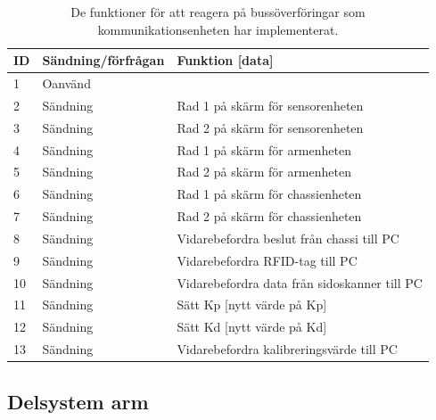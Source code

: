 \begin{table}[H]
\centering

\begin{tabularx}{\textwidth}{|l|l|X|}
\hline
\textbf{ID} & \textbf{Sändning/förfrågan} & \textbf{Funktion [data]} \\ \hline
1 & Oanvänd & \\ \hline
2 & Sändning & Rad 1 på skärm för sensorenheten \\ \hline
3 & Sändning & Rad 2 på skärm för sensorenheten \\ \hline
4 & Sändning & Rad 1 på skärm för armenheten \\ \hline
5 & Sändning & Rad 2 på skärm för armenheten \\ \hline
6 & Sändning & Rad 1 på skärm för chassienheten \\ \hline
7 & Sändning & Rad 2 på skärm för chassienheten \\ \hline
8 & Sändning & Vidarebefordra beslut från chassi till PC \\ \hline
9 & Sändning & Vidarebefordra RFID-tag till PC\\ \hline
10 & Sändning & Vidarebefordra data från sidoskanner till PC \\ \hline
11 & Sändning & Sätt Kp [nytt värde på Kp] \\ \hline
12 & Sändning & Sätt Kd [nytt värde på Kd] \\ \hline
13 & Sändning & Vidarebefordra kalibreringsvärde till PC \\ \hline
\end{tabularx}
\caption{De funktioner för att reagera på bussöverföringar som kommunikationsenheten har implementerat.}
\label{tab:callbacks-komm}
\end{table}

\subsection{Delsystem arm}


